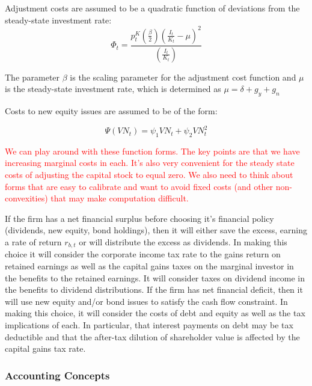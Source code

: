 Adjustment costs are assumed to be a quadratic function of deviations from the steady-state investment rate:
\begin{equation}
\label{eqn:adj_cost}
\Phi_{t}=\frac{p^{K}_{t}\left(\frac{\beta}{2}\right)\left(\frac{I_{t}}{K_{t}}-\mu\right)^{2}}{\left(\frac{I_{t}}{K_{t}}\right)}
\end{equation}

\noindent\noindent The parameter $\beta$ is the scaling parameter for the adjustment cost function and $\mu$ is the steady-state investment rate, which is determined as $\mu=\delta+g_{y}+g_{n}$

Costs to new equity issues are assumed to be of the form:

\begin{equation}
\label{eqn:equity_cost}
\Psi(VN_{t})= \psi_{1}VN_{t} + \psi_{2}VN_{t}^{2}
\end{equation}

\textcolor{red}{We can play around with these function forms.  The key points are that we have increasing marginal costs in each. It's also very convenient for the steady state costs of adjusting the capital stock to equal zero.  We also need to think about forms that are easy to calibrate and want to avoid fixed costs (and other non-convexities) that may make computation difficult.}

If the firm has a net financial surplus before choosing it's financial policy (dividends, new equity, bond holdings), then it will either save the excess, earning a rate of return $r_{b,t}$ or will distribute the excess as dividends.  In making this choice it will consider the corporate income tax rate to the gains return on retained earnings as well as the capital gains taxes on the marginal investor in the benefits to the retained earnings.  It will consider taxes on dividend income in the benefits to dividend distributions.  If the firm has net financial deficit, then it will use new equity and/or bond issues to satisfy the cash flow constraint. In making this choice, it will consider the costs of debt and equity as well as the tax implications of each.  In particular, that interest payments on debt may be tax deductible and that the after-tax dilution of shareholder value is affected by the capital gains tax rate.



\subsubsection{Accounting Concepts}


